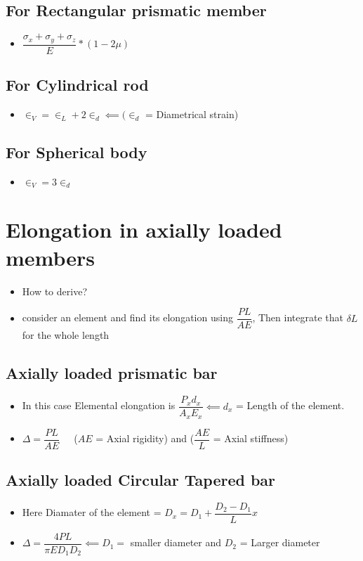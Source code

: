 \documentclass[8pt]{report}
\begin{document}
		\subsection{For Rectangular prismatic member}
			\begin{itemize}
				\item $\boxed{\dfrac{\sigma_x+\sigma_y+\sigma_z}{E}*(1-2\mu)}$
			\end{itemize}
		\subsection{For Cylindrical rod}
			\begin{itemize}
				\item $\boxed{\in_V=\in_L+2\in_d} \impliedby (\in_d$ = Diametrical strain)
			\end{itemize}
		\subsection{For Spherical body}
			\begin{itemize}
				\item $\boxed{\in_V=3\in_d}$
			\end{itemize}\hrulefill
	\section{Elongation in axially loaded members}
		\begin{itemize}
			\item How to derive?
			\item consider an element and find its elongation using $\dfrac{PL}{AE}$, Then integrate that $\delta L$ for the whole length
		\end{itemize}
		\subsection{Axially loaded prismatic bar}
			\begin{itemize}
				\item In this case Elemental elongation is $\dfrac{P_xd_x}{A_xE_x} \impliedby d_x$ = Length of the element. 
				\item $\boxed{\Delta = \dfrac{PL}{AE}}\;\;\;\;$ ($AE$ = Axial rigidity) and ($\dfrac{AE}{L}$ = Axial stiffness)
			\end{itemize}
		\subsection{Axially loaded Circular Tapered bar}
			\begin{itemize}
				\item Here Diamater of the element = $D_x = D_1+\dfrac{D_2-D_1}{L}x$
				\item $\boxed{\Delta = \dfrac{4PL}{\pi E D_1D_2}} \impliedby D_1 =$ smaller diameter and $D_2$ = Larger diameter
			\end{itemize}
\end{document}
